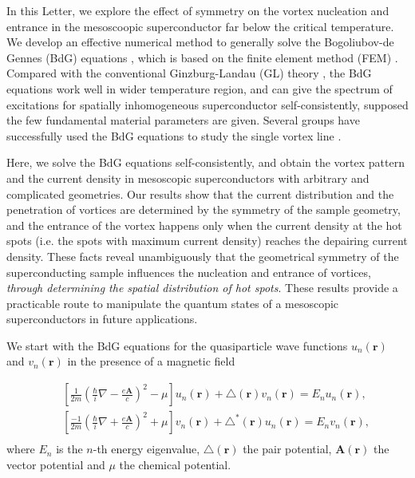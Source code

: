 \documentclass[aps,prl,showpacs,twocolumn]{revtex4}
\begin{document}
In this Letter, we explore the effect of symmetry on the vortex
nucleation and entrance in the mesoscoopic superconductor far below
the critical temperature. We develop an effective numerical method
to generally solve the Bogoliubov-de Gennes (BdG) equations
\cite{gennes}, which is based on the finite element method (FEM)
\cite{zienkiewicz, suematsu}.  Compared with the conventional
Ginzburg-Landau (GL) theory \cite{tinkham}, the BdG equations work
well in wider temperature region, and can give the spectrum of
excitations for spatially inhomogeneous superconductor
self-consistently, supposed the few fundamental material parameters
are given.  Several groups have successfully used the BdG equations
to study the single vortex line \cite{hayashi,kato,melnikov,gygi}.

Here, we solve the BdG equations self-consistently, and obtain the
vortex pattern and the current density in mesoscopic superconductors
with arbitrary and complicated geometries. Our results show that the
current distribution and the penetration of vortices are determined
by the symmetry of the sample geometry, and the entrance of the
vortex happens only when the current density at the hot spots (i.e.
the spots with maximum current density) reaches the depairing
current density. These facts reveal unambiguously that the
geometrical symmetry of the superconducting sample influences the
nucleation and entrance of vortices, {\it through determining the
spatial distribution of hot spots}. These results provide a
practicable route to manipulate the quantum states of a mesoscopic
superconductors in future applications.

We start with the BdG equations for the quasiparticle wave functions
$u_n(\textbf{r})$ and $v_n(\textbf{r})$ in the presence of a
magnetic field

\begin{eqnarray}
&&\left[\frac{1}{2m}(\frac{\hbar}{i}\nabla-\frac{e\textbf{A}}{c})^2
-\mu\right]u_n(\textbf{r})+\triangle(\textbf{r})
v_n(\textbf{r})=E_n
u_n(\textbf{r}),\nonumber\\
&&\left[\frac{-1}{2m}(\frac{\hbar}{i}\nabla+\frac{e\textbf{A}}{c})^2
+\mu\right]v_n(\textbf{r})+\triangle^{*}(\textbf{r})u_n(\textbf{r})=E_n
v_n(\textbf{r}),\nonumber\\
\label{BdG}
\end{eqnarray}
where $E_n$ is the $n$-th energy eigenvalue, $\triangle(\textbf{r})$
the pair potential, $\textbf{A}(\textbf{r})$ the vector potential
and $\mu$ the chemical potential.
\end{document}
